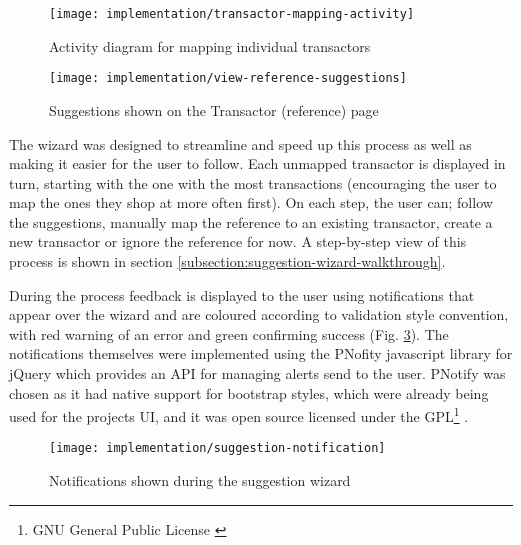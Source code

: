 \begin{figure}[h]
    \centering
    \texttt{[image: implementation/transactor-mapping-activity]}
    \caption{Activity diagram for mapping individual transactors}
    \label{fig:transactor-mapping-activity}
    
    \begin{comment}
(start)->(Open Statement)->(Search Statement)-><a>->(end)
<a>->(Open Transactor)->(Map Transactor)->(Open Statement)
    \end{comment}
\end{figure}

\begin{figure}[h]
    \centering
    \texttt{[image: implementation/view-reference-suggestions]}
    \caption{Suggestions shown on the Transactor (reference) page}
    \label{fig:view-reference-suggestions}
\end{figure}

The wizard was designed to streamline and speed up this process as well as making it easier for the user to follow. Each unmapped transactor is displayed in turn, starting with the one with the most transactions (encouraging the user to map the ones they shop at more often first). On each step, the user can; follow the suggestions, manually map the reference to an existing transactor, create a new transactor or ignore the reference for now. A step-by-step view of this process is shown in section \ref{subsection:suggestion-wizard-walkthrough}.

During the process feedback is displayed to the user using notifications that appear over the wizard and are coloured according to validation style convention, with red warning of an error and green confirming success (Fig. \ref{fig:suggestion-notification}). 
%
The notifications themselves were implemented using the PNofity javascript library for jQuery which provides an API for managing alerts send to the user. PNotify was chosen as it had native support for bootstrap styles, which were already being used for the projects UI, and it was open source licensed under the GPL\footnote{GNU General Public License \parencite{gnu2007license}} \parencite{huber2014potify}.

\begin{figure}[h]
    \centering
    \texttt{[image: implementation/suggestion-notification]}
    \caption{Notifications shown during the suggestion wizard}
    \label{fig:suggestion-notification}
\end{figure}

